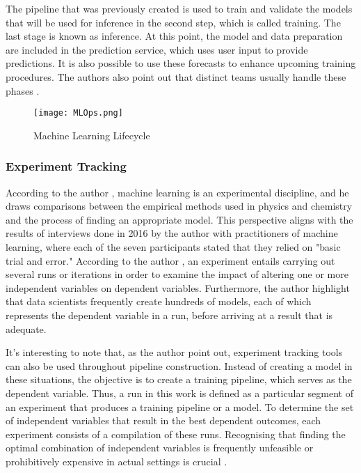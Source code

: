\documentclass[12pt]{article}
\begin{document}
The pipeline that was previously created is used to train and validate the models that will be used for inference in the second step, which is called training. The last stage is known as inference. At this point, the model and data preparation are included in the prediction service, which uses user input to provide predictions. It is also possible to use these forecasts to enhance upcoming training procedures. The authors also point out that distinct teams usually handle these phases \cite{garcia2018context}.

\begin{figure}[h!t]
\centering
\texttt{[image: MLOps.png]}
\caption{Machine Learning Lifecycle}
\label{fig:mlops}
\end{figure}

\subsubsection{Experiment Tracking}
According to the author \cite{langley1988machine}, machine learning is an experimental discipline, and he draws comparisons between the empirical methods used in physics and chemistry and the process of finding an appropriate model. This perspective aligns with the results of interviews done in 2016 by the author \cite{hill2016trials} with practitioners of machine learning, where each of the seven participants stated that they relied on "basic trial and error." According to the author \cite{langley1988machine}, an experiment entails carrying out several runs or iterations in order to examine the impact of altering one or more independent variables on dependent variables. Furthermore, the author \cite{vartak2016modeldb} highlight that data scientists frequently create hundreds of models, each of which represents the dependent variable in a run, before arriving at a result that is adequate.

It's interesting to note that, as the author \cite{garcia2018context} point out, experiment tracking tools can also be used throughout pipeline construction. Instead of creating a model in these situations, the objective is to create a training pipeline, which serves as the dependent variable. Thus, a run in this work is defined as a particular segment of an experiment that produces a training pipeline or a model. To determine the set of independent variables that result in the best dependent outcomes, each experiment consists of a compilation of these runs. Recognising that finding the optimal combination of independent variables is frequently unfeasible or prohibitively expensive in actual settings is crucial \cite{goodfellow2016deep}.
\end{document}
